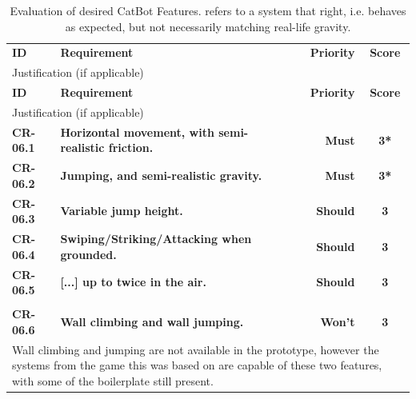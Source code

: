 \begin{center}
  \begin{longtable}{llrc}
    \caption[Full evaluation of desired CatBot Features]{Evaluation of desired CatBot Features.  refers to a system that  right, i.e. behaves as expected, but not necessarily matching real-life gravity.} \label{tab:resultsFull/cr/autoCatFeatures} \\
    \toprule
    \textbf{ID}
    & \textbf{Requirement}
    & \textbf{Priority}
    & \textbf{Score} \\
    \multicolumn{4}{l}{
        Justification (if applicable)
    }
    \\ \midrule
    \endfirsthead
    \toprule
    \textbf{ID}
    & \textbf{Requirement}
    & \textbf{Priority}
    & \textbf{Score} \\
    \multicolumn{4}{l}{
        Justification (if applicable)
    }
    \\ \midrule
    \endhead
    \textbf{CR-06.1}
    & \textbf{Horizontal movement, with semi-realistic friction.}
    & \textbf{Must}
    & \textbf{3*}
    \\
    \textbf{CR-06.2}
    & \textbf{Jumping, and semi-realistic gravity.}
    & \textbf{Must}
    & \textbf{3*}
    \\
    \textbf{CR-06.3}
    & \textbf{Variable jump height.}
    & \textbf{Should}
    & \textbf{3}
    \\
    \textbf{CR-06.4}
    & \textbf{Swiping/Striking/Attacking when grounded.}
    & \textbf{Should}
    & \textbf{3}
    \\
    \textbf{CR-06.5}
    & \textbf{[...] up to twice in the air.}
    & \textbf{Should}
    & \textbf{3}
    \\ \\
    \textbf{CR-06.6}
    & \textbf{Wall climbing and wall jumping.}
    & \textbf{Won't}
    & \textbf{3}
    \\
    \multicolumn{4}{p{0.98\linewidth}}{
        Wall climbing and jumping are not available in the prototype, however the systems from the game this was based on are capable of these two features, with some of the boilerplate still present.
    }
    \\
    \bottomrule
  \end{longtable}
\end{center}